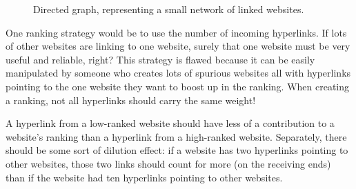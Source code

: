 \documentclass[10pt,answers]{exam}
\begin{document}
\begin{figure}[H]
  \begin{center}
  \end{center}
  \caption{Directed graph, representing a small network of linked websites.}
  \label{fig:graph1}
\end{figure}

One ranking strategy would be to use the number of incoming hyperlinks.  If lots
of other websites are linking to one website, surely that one website must be
very useful and reliable, right?  This strategy is flawed because it can be
easily manipulated by someone who creates lots of spurious websites all with
hyperlinks pointing to the one website they want to boost up in the ranking.
When creating a ranking, not all hyperlinks should carry the same weight!

\vspace{.2cm}

A hyperlink from a low-ranked website should have less of a contribution
to a website's ranking than a hyperlink from a high-ranked website.  Separately, there should
be some sort of dilution effect: if a website has two
hyperlinks pointing to other websites, those two links should count for more (on the receiving
ends) than if the website had ten hyperlinks pointing to other websites.

\newpage
\end{document}
